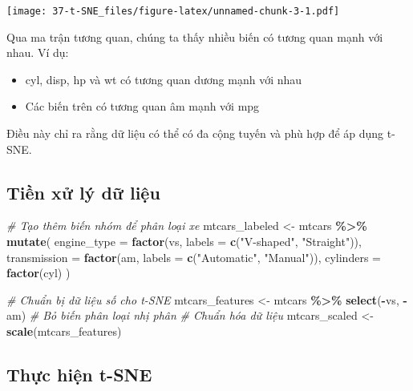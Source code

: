 \documentclass[
]{article}
\newenvironment{Shaded}{\begin{snugshade}}{\end{snugshade}}
\newcommand{\AttributeTok}[1]{\textcolor[rgb]{0.13,0.29,0.53}{#1}}
\newcommand{\CommentTok}[1]{\textcolor[rgb]{0.56,0.35,0.01}{\textit{#1}}}
\newcommand{\FunctionTok}[1]{\textcolor[rgb]{0.13,0.29,0.53}{\textbf{#1}}}
\newcommand{\NormalTok}[1]{#1}
\newcommand{\OtherTok}[1]{\textcolor[rgb]{0.56,0.35,0.01}{#1}}
\newcommand{\SpecialCharTok}[1]{\textcolor[rgb]{0.81,0.36,0.00}{\textbf{#1}}}
\newcommand{\StringTok}[1]{\textcolor[rgb]{0.31,0.60,0.02}{#1}}
\providecommand{\tightlist}{%
  \setlength{\itemsep}{0pt}\setlength{\parskip}{0pt}}
\begin{document}
\texttt{[image: 37-t-SNE\_files/figure-latex/unnamed-chunk-3-1.pdf]}

Qua ma trận tương quan, chúng ta thấy nhiều biến có tương quan mạnh với
nhau. Ví dụ:

\begin{itemize}
\tightlist
\item
  cyl, disp, hp và wt có tương quan dương mạnh với nhau
\item
  Các biến trên có tương quan âm mạnh với mpg
\end{itemize}

Điều này chỉ ra rằng dữ liệu có thể có đa cộng tuyến và phù hợp để áp
dụng t-SNE.

\subsection{Tiền xử lý dữ
liệu}\label{tiux1ec1n-xux1eed-luxfd-dux1eef-liux1ec7u}

\begin{Shaded}
\begin{Highlighting}[]
\CommentTok{\# Tạo thêm biến nhóm để phân loại xe}
\NormalTok{mtcars\_labeled }\OtherTok{\textless{}{-}}\NormalTok{ mtcars }\SpecialCharTok{\%\textgreater{}\%}
  \FunctionTok{mutate}\NormalTok{(}
    \AttributeTok{engine\_type =} \FunctionTok{factor}\NormalTok{(vs, }\AttributeTok{labels =} \FunctionTok{c}\NormalTok{(}\StringTok{"V{-}shaped"}\NormalTok{, }\StringTok{"Straight"}\NormalTok{)),}
    \AttributeTok{transmission =} \FunctionTok{factor}\NormalTok{(am, }\AttributeTok{labels =} \FunctionTok{c}\NormalTok{(}\StringTok{"Automatic"}\NormalTok{, }\StringTok{"Manual"}\NormalTok{)),}
    \AttributeTok{cylinders =} \FunctionTok{factor}\NormalTok{(cyl)}
\NormalTok{  )}

\CommentTok{\# Chuẩn bị dữ liệu số cho t{-}SNE}
\NormalTok{mtcars\_features }\OtherTok{\textless{}{-}}\NormalTok{ mtcars }\SpecialCharTok{\%\textgreater{}\%} \FunctionTok{select}\NormalTok{(}\SpecialCharTok{{-}}\NormalTok{vs, }\SpecialCharTok{{-}}\NormalTok{am) }\CommentTok{\# Bỏ biến phân loại nhị phân}
\CommentTok{\# Chuẩn hóa dữ liệu}
\NormalTok{mtcars\_scaled }\OtherTok{\textless{}{-}} \FunctionTok{scale}\NormalTok{(mtcars\_features)}
\end{Highlighting}
\end{Shaded}

\subsection{Thực hiện t-SNE}\label{thux1ef1c-hiux1ec7n-t-sne}
\end{document}

